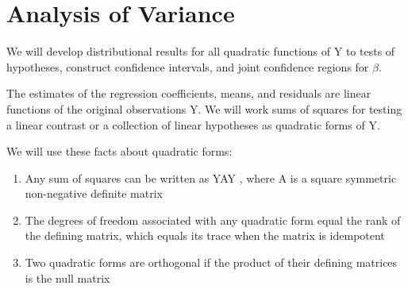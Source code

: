 \documentclass[letterpaper,11pt]{article}
\begin{document}
\section{Analysis of Variance}

We will develop distributional results for all quadratic functions of Y to tests of hypotheses, construct confidence intervals, and joint 
confidence regions for $\beta$.

The estimates of the regression coefficients, means, and residuals are linear functions of the original observations Y.
We will work sums of squares for testing a linear contrast or a collection of linear hypotheses as quadratic forms of Y. 

We will use these facts about quadratic forms:

\begin{enumerate}
	\item Any sum of squares can be written as YAY , where A is a square symmetric non-negative definite matrix
	\item The degrees of freedom associated with any quadratic form equal the rank of the defining matrix, which equals its trace
         when the matrix is idempotent
	\item Two quadratic forms are orthogonal if the product of their defining matrices is the null matrix
\end{enumerate}
\end{document}
